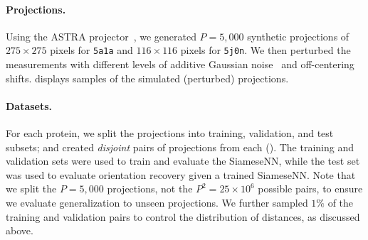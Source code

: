 
\paragraph{Projections.}
Using the ASTRA projector~\cite{van2015astra}, we generated $P=5,000$ synthetic projections of $275 \times 275$ pixels for \texttt{5a1a} and $116 \times 116$ pixels for \texttt{5j0n}.
We then perturbed the measurements with different levels of additive Gaussian noise~\cite{sorzano2004normalizing,shigematsu2013noise} and off-centering shifts. %
 displays samples of the simulated (perturbed) projections.

\paragraph{Datasets.}
For each protein, we split the projections into training, validation, and test subsets; and created \textit{disjoint} pairs of projections from each ().
The training and validation sets were used to train and evaluate the SiameseNN, while the test set was used to evaluate orientation recovery given a trained SiameseNN.
Note that we split the $P=5,000$ projections, not the $P^2 = 25 \times 10^6$ possible pairs, to ensure we evaluate generalization to unseen projections.
We further sampled $1\%$ of the training and validation pairs to control the distribution of distances, as discussed above.


